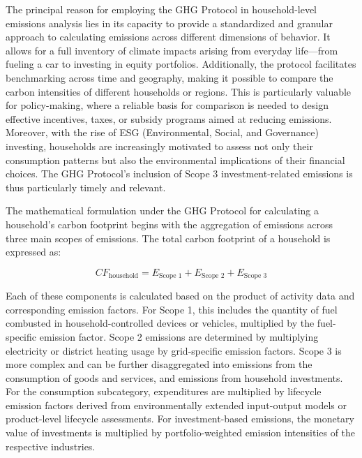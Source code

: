 \documentclass[12pt,a4paper]{article}%
\begin{document}
The principal reason for employing the GHG Protocol in household-level emissions analysis lies in its capacity to provide a standardized and granular approach to calculating emissions across different dimensions of behavior. It allows for a full inventory of climate impacts arising from everyday life—from fueling a car to investing in equity portfolios. Additionally, the protocol facilitates benchmarking across time and geography, making it possible to compare the carbon intensities of different households or regions. This is particularly valuable for policy-making, where a reliable basis for comparison is needed to design effective incentives, taxes, or subsidy programs aimed at reducing emissions. Moreover, with the rise of ESG (Environmental, Social, and Governance) investing, households are increasingly motivated to assess not only their consumption patterns but also the environmental implications of their financial choices. The GHG Protocol's inclusion of Scope 3 investment-related emissions is thus particularly timely and relevant.

The mathematical formulation under the GHG Protocol for calculating a household’s carbon footprint begins with the aggregation of emissions across three main scopes of emissions. The total carbon footprint of a household is expressed as:

\begin{equation}
CF_{\text{household}} = E_{\text{Scope 1}} + E_{\text{Scope 2}} + E_{\text{Scope 3}}
\end{equation}

Each of these components is calculated based on the product of activity data and corresponding emission factors. For Scope 1, this includes the quantity of fuel combusted in household-controlled devices or vehicles, multiplied by the fuel-specific emission factor. Scope 2 emissions are determined by multiplying electricity or district heating usage by grid-specific emission factors. Scope 3 is more complex and can be further disaggregated into emissions from the consumption of goods and services, and emissions from household investments. For the consumption subcategory, expenditures are multiplied by lifecycle emission factors derived from environmentally extended input-output models or product-level lifecycle assessments. For investment-based emissions, the monetary value of investments is multiplied by portfolio-weighted emission intensities of the respective industries.
\end{document}
